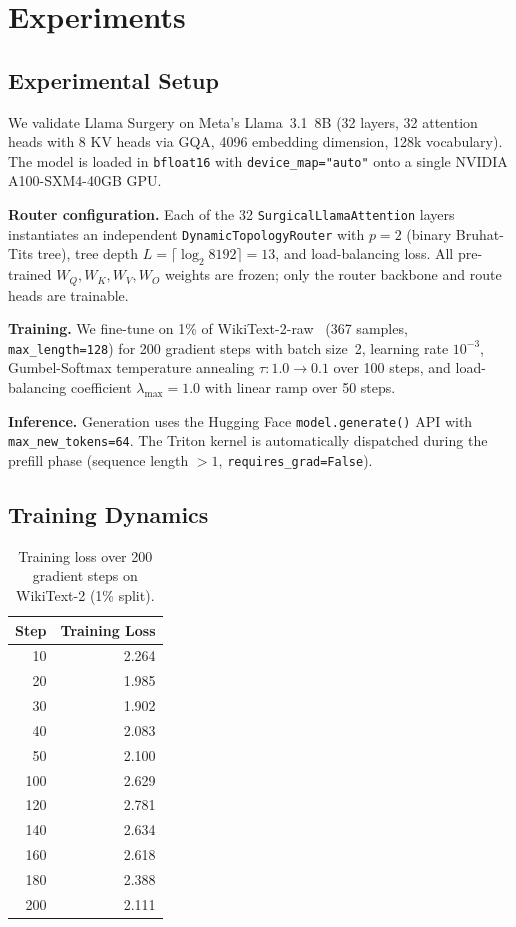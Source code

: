 \documentclass[11pt,a4paper]{article}
\begin{document}
\section{Experiments}

\subsection{Experimental Setup}

We validate Llama Surgery on Meta's Llama~3.1~8B (32 layers, 32 attention heads with 8 KV heads via GQA, 4096 embedding dimension, 128k vocabulary). The model is loaded in \texttt{bfloat16} with \texttt{device\_map="auto"} onto a single NVIDIA A100-SXM4-40GB GPU.

\textbf{Router configuration.} Each of the 32 \texttt{SurgicalLlamaAttention} layers instantiates an independent \texttt{DynamicTopologyRouter} with $p = 2$ (binary Bruhat-Tits tree), tree depth $L = \lceil \log_2 8192 \rceil = 13$, and load-balancing loss. All pre-trained $W_Q, W_K, W_V, W_O$ weights are frozen; only the router backbone and route heads are trainable.

\textbf{Training.} We fine-tune on 1\% of WikiText-2-raw~\citep{merity2017pointer} (367 samples, \texttt{max\_length=128}) for 200 gradient steps with batch size~2, learning rate $10^{-3}$, Gumbel-Softmax temperature annealing $\tau: 1.0 \to 0.1$ over 100 steps, and load-balancing coefficient $\lambda_{\max} = 1.0$ with linear ramp over 50 steps.

\textbf{Inference.} Generation uses the Hugging Face \texttt{model.generate()} API with \texttt{max\_new\_tokens=64}. The Triton kernel is automatically dispatched during the prefill phase (sequence length $> 1$, \texttt{requires\_grad=False}).

\subsection{Training Dynamics}

\begin{table}[h]
\centering
\caption{Training loss over 200 gradient steps on WikiText-2 (1\% split).}
\label{tab:training}
\begin{tabular}{@{}rr@{}}
\toprule
Step & Training Loss \\
\midrule
10   & 2.264 \\
20   & 1.985 \\
30   & 1.902 \\
40   & 2.083 \\
50   & 2.100 \\
100  & 2.629 \\
120  & 2.781 \\
140  & 2.634 \\
160  & 2.618 \\
180  & 2.388 \\
200  & 2.111 \\
\bottomrule
\end{tabular}
\end{table}
\end{document}
